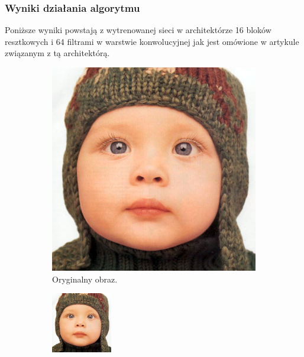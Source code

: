 \documentclass[a4paper,11pt, notitlepage ]{article}
\begin{document}
 \subsubsection{Wyniki działania algorytmu}
 Poniższe wyniki powstają z wytrenowanej sieci w architektórze 16 bloków resztkowych i 64 filtrami w warstwie konwolucyjnej jak jest omówione w artykule związanym z tą architektórą.
 	 \begin{figure}[h!]
 	\centering
 	\begin{subfigure}[b]{0.4\linewidth}
 		\includegraphics[width=\linewidth]{baby_GT.png}
 		\caption{Oryginalny obraz.}
 	\end{subfigure}
 	\begin{subfigure}[b]{0.4\linewidth}
 		\includegraphics[width=\linewidth]{EDSR/EDSR_INPUT.png}

\end{subfigure}
\end{figure}
\end{document}
